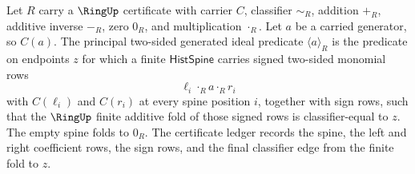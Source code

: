 \begin{definition}
\label{def:ideal-principal-generated-predicate}
Let $R$ carry a $\RingUp$ certificate with carrier $C$, classifier $\sim_R$, addition $+_R$, additive inverse $-_R$, zero $0_R$, and multiplication $\cdot_R$. Let $a$ be a carried generator, so $C(a)$. The principal two-sided generated ideal predicate $\langle a\rangle_R$ is the predicate on endpoints $z$ for which a finite $\mathsf{HistSpine}$ carries signed two-sided monomial rows
$$
\ell_i\cdot_R a\cdot_R r_i
$$
with $C(\ell_i)$ and $C(r_i)$ at every spine position $i$, together with sign rows, such that the $\RingUp$ finite additive fold of those signed rows is classifier-equal to $z$. The empty spine folds to $0_R$. The certificate ledger records the spine, the left and right coefficient rows, the sign rows, and the final classifier edge from the finite fold to $z$.
\end{definition}


